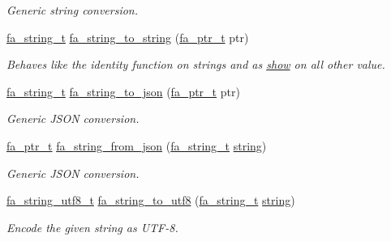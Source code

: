 \begin{DoxyCompactItemize}
\begin{DoxyCompactList}\small\item\em Generic string conversion. \end{DoxyCompactList}\item 
\hyperlink{group___fa_string_gacada63033b77bc6c39fa632ae199349b}{fa\-\_\-string\-\_\-t} \hyperlink{group___fa_string_gaeada11707ff4ebc7bfbd49652dd74524}{fa\-\_\-string\-\_\-to\-\_\-string} (\hyperlink{group___fa_ga915ddeae99ad7568b273d2b876425197}{fa\-\_\-ptr\-\_\-t} ptr)
\begin{DoxyCompactList}\small\item\em Behaves like the identity function on strings and as \hyperlink{group___fa_string_ga0aefa62c17e377bdf1502d6a31c989a7}{show} on all other value. \end{DoxyCompactList}\item 
\hyperlink{group___fa_string_gacada63033b77bc6c39fa632ae199349b}{fa\-\_\-string\-\_\-t} \hyperlink{group___fa_string_gad32198fd893b60271162c33f32d70a5e}{fa\-\_\-string\-\_\-to\-\_\-json} (\hyperlink{group___fa_ga915ddeae99ad7568b273d2b876425197}{fa\-\_\-ptr\-\_\-t} ptr)
\begin{DoxyCompactList}\small\item\em Generic J\-S\-O\-N conversion. \end{DoxyCompactList}\item 
\hyperlink{group___fa_ga915ddeae99ad7568b273d2b876425197}{fa\-\_\-ptr\-\_\-t} \hyperlink{group___fa_string_gac9b5abd8898a76b522395b3017d1f91f}{fa\-\_\-string\-\_\-from\-\_\-json} (\hyperlink{group___fa_string_gacada63033b77bc6c39fa632ae199349b}{fa\-\_\-string\-\_\-t} \hyperlink{util_8h_a41106000aac73b61e4fc2ef9dd39a603}{string})
\begin{DoxyCompactList}\small\item\em Generic J\-S\-O\-N conversion. \end{DoxyCompactList}\item 
\hyperlink{group___fa_string_ga3f817d24799e6924bc6a5186cd184fd8}{fa\-\_\-string\-\_\-utf8\-\_\-t} \hyperlink{group___fa_string_ga001482eba39fa23052477bd72df2b330}{fa\-\_\-string\-\_\-to\-\_\-utf8} (\hyperlink{group___fa_string_gacada63033b77bc6c39fa632ae199349b}{fa\-\_\-string\-\_\-t} \hyperlink{util_8h_a41106000aac73b61e4fc2ef9dd39a603}{string})
\begin{DoxyCompactList}\small\item\em Encode the given string as U\-T\-F-\/8. \end{DoxyCompactList}\item 

\end{DoxyCompactItemize}
